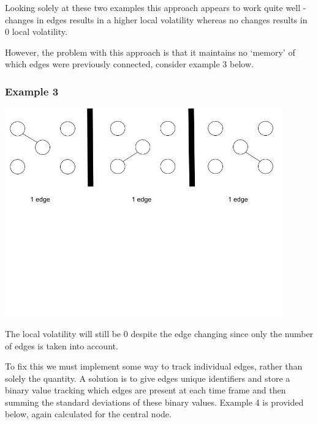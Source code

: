 Looking solely at these two examples this approach appears to work quite well - changes in edges results in a higher local volatility whereas no changes results in 0 local volatility.

However, the problem with this approach is that it maintains no ‘memory’ of which edges were previously connected, consider example 3 below.
\begin{center}
\subsubsection*{Example 3}
\includegraphics[trim={0 10cm 0 -1cm}, width=120mm]{./Figures/volatility3.jpg}
\end{center}

The local volatility will still be 0 despite the edge changing since only the number of edges is taken into account.

To fix this we must implement some way to track individual edges, rather than solely the quantity. A solution is to give edges unique identifiers and store a binary value tracking which edges are present at each time frame and then summing the standard deviations of these binary values. Example 4 is provided below, again calculated for the central node.

